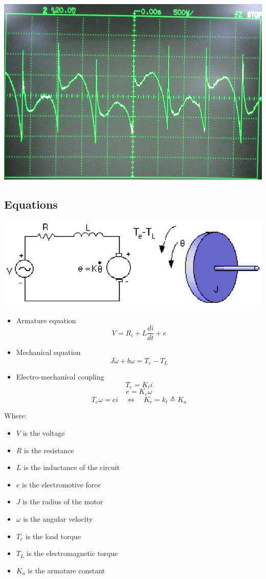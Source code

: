 \documentclass[11pt]{article}
\begin{document}
\begin{center}
\includegraphics[width=.9\linewidth]{./images/3-pole-dc-motor-oscilloscope.png}
\end{center}

 \newpage
\subsection{Equations}
\label{sec:orgd0a87a9}
\begin{center}
\includegraphics[width=.9\linewidth]{./images/dc-motor-equations-diagram.png}
\end{center}
\begin{itemize}
\item Armature equation
\[V = R_i + L \frac{di}{dt} + e\]

\item Mechanical equation
\[J \dot{\omega} + b \omega = T_e - T_L\]

\item Electro-mechanical coupling
\[T_e = K_t i\]
\[e = K_e \omega\]
\[T_e \omega = e i \quad \Leftrightarrow \quad K_e = k_t \triangleq K_a\]
\end{itemize}

Where:
\begin{itemize}
\item \(V\) is the voltage
\item \(R\) is the resistance
\item \(L\) is the inductance of the circuit
\item \(e\) is the electromotive force
\item \(J\) is the radius of the motor
\item \(\omega\) is the angular velocity
\item \(T_e\) is the load torque
\item \(T_L\) is the electromagnetic torque
\item \(K_a\) is the armature constant
\end{itemize}
\end{document}
